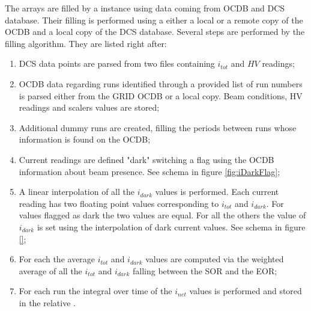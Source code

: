 The  arrays are filled by a  instance using data coming from OCDB and DCS database.
Their filling is performed using a either a local or a remote copy of the OCDB and a local copy of the DCS database.
Several steps are performed by the filling algorithm.
They are listed right after:
\begin{enumerate}
\item DCS data points are parsed from two files containing $i_{tot}$ and $HV$ readings;
\item OCDB data regarding runs identified through a provided list of run numbers is parsed either from the GRID OCDB or a local copy. Beam conditions, HV readings and scalers values are stored;
\item Additional dummy runs are created, filling the periods between runs whose information is found on the OCDB;
\item Current readings are defined "dark" switching a  flag using the OCDB information about beam presence. See schema in figure \ref{fig:iDarkFlag};
\item A linear interpolation of all the $i_{dark}$ values is performed. Each current reading has two floating point values corresponding to $i_{tot}$ and $i_{dark}$. For values flagged as dark the two values are equal. For all the others the value of $i_{dark}$ is set using the interpolation of dark current values. See schema in figure \ref{};
\item For each  the average $i_{tot}$ and $i_{dark}$ values are computed via the weighted average of all the $i_{tot}$ and $i_{dark}$ falling between the SOR and the EOR;
\item For each run the integral over time of the $i_{net}$ values is performed and stored in the relative .
\end{enumerate}

